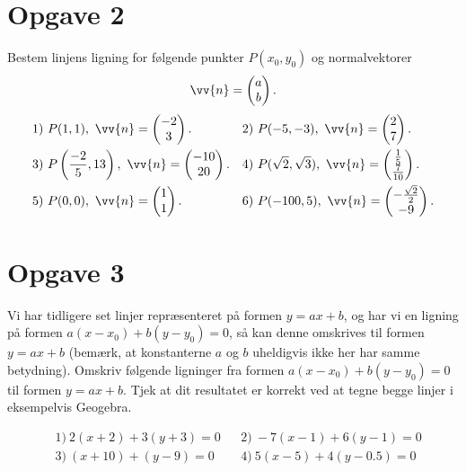 \section*{Opgave 2}
Bestem linjens ligning for følgende punkter $P(x_0,y_0)$ og normalvektorer $$\vv{n} = \begin{pmatrix}
a \\ b
\end{pmatrix}.$$
\begin{align*}
&1) \ P(1,1), \ \vv{n} = \begin{pmatrix}
-2 \\ 3
\end{pmatrix}.   &&2) \ P(-5,-3), \ \vv{n} = \begin{pmatrix}
2 \\ 7
\end{pmatrix}.    \\
&3) \ P\left(\frac{-2}{5},13\right), \ \vv{n} = \begin{pmatrix}
-10 \\ 20
\end{pmatrix}.   &&4) \ P(\sqrt{2},\sqrt{3}), \ \vv{n} = \begin{pmatrix}
\frac{1}{5} \\ \frac{7}{10}
\end{pmatrix}.   \\
&5) \ P(0,0), \ \vv{n} = \begin{pmatrix}
1 \\ 1
\end{pmatrix}.   &&6) \ P(-100,5), \ \vv{n} = \begin{pmatrix}
-\frac{\sqrt{2}}{2} \\ -9
\end{pmatrix}.   \\
\end{align*}

\section*{Opgave 3}
Vi har tidligere set linjer repræsenteret på formen $y = ax+b$, og har vi en ligning på formen $a(x-x_0) + b(y-y_0) = 0$, så kan denne omskrives til formen\\ $y = ax+b$ (bemærk, at konstanterne $a$ og $b$ uheldigvis ikke her har samme betydning). Omskriv følgende ligninger fra formen $a(x-x_0) + b(y-y_0) = 0$ til formen $y=ax+b$. Tjek at dit resultatet er korrekt ved at tegne begge linjer i eksempelvis Geogebra. 

\begin{align*}
&1) \ 2(x+2) + 3(y+3) = 0 &&2) \ -7(x-1) + 6(y-1) = 0\\
&3) \ (x+10) + (y-9) = 0 &&4) \ 5(x-5) + 4(y-0.5) = 0\\
\end{align*}

